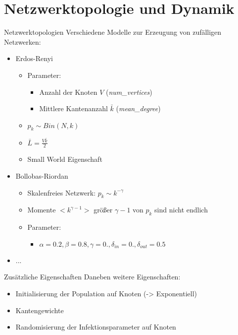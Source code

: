\section{Netzwerktopologie und Dynamik}
\newcommand{\mdeg}{\bar{k}}
\newcommand{\vertices}{V}
\newcommand{\initrand}{\emph{init\_random\_weight}}
\newcommand{\infparamrand}{\emph{random\_infection\_parameters}}
\newcommand{\poprand}{\emph{random\_population}}
\newcommand{\medges}{\bar{L}}
\begin{frame}[t]{Netzwerktopologien} 
    Verschiedene Modelle zur Erzeugung von zufälligen Netzwerken:
    \begin{itemize}
        \item Erdos-Renyi
            \begin{itemize}
            \item Parameter:
                \begin{itemize}
                    \item Anzahl der Knoten $\vertices$ (\emph{num\_vertices})
                    \item Mittlere Kantenanzahl $\mdeg$ (\emph{mean\_degree})
                \end{itemize}
            \item $p_k \sim Bin(N, k)$
            \item $\medges = \frac{\vertices \mdeg}{2}$
            \item Small World Eigenschaft
        \end{itemize}
        \item Bollobas-Riordan
            \begin{itemize}
                \item Skalenfreies Netzwerk: $p_k \sim k^{-\gamma}$
                \item Momente $<k^{\gamma -1}>$ größer $\gamma - 1$ von $p_k$ sind nicht endlich
                \item Parameter:
                    \begin{itemize}
                        \item $\alpha = 0.2, \beta=0.8, \gamma = 0., \delta_{in} = 0.,
                            \delta_{out} = 0.5$
                    \end{itemize}
            \end{itemize}
        \item ...
    \end{itemize}
\end{frame}
\begin{frame}{Zusätzliche Eigenschaften}
Daneben weitere Eigenschaften:
    \begin{itemize}
        \item Initialisierung der Population auf Knoten (-> Exponentiell)
        \item Kantengewichte
        \item Randomisierung der Infektionsparameter auf Knoten
    \end{itemize}
\end{frame}

